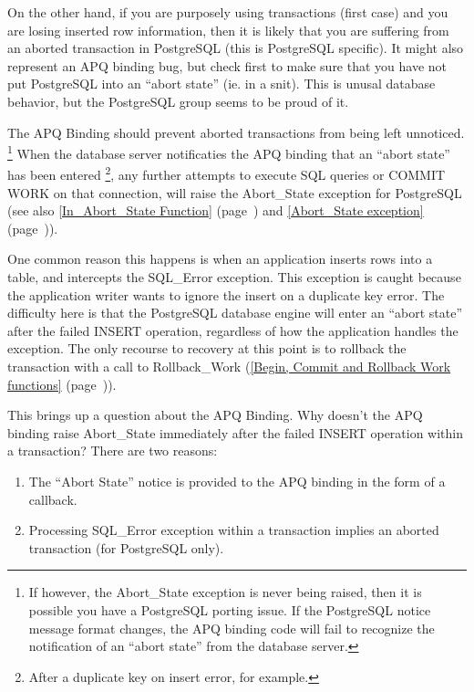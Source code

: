 \documentclass[english,letterpaper]{book}
\newcommand\Ref[1]{\textsection\ref{#1} (page~\pageref{#1})}
\begin{document}
On the other hand, if you are purposely using transactions (first
case) and you are losing inserted row information, then it is likely
that you are suffering from an aborted transaction in PostgreSQL (this
is PostgreSQL specific). It might also represent an APQ binding bug,
but check first to make sure that you have not put PostgreSQL into
an ``abort state'' (ie. in a snit). This is unusal database behavior,
but the PostgreSQL group seems to be proud of it.

The APQ Binding should prevent aborted transactions from being left
unnoticed.%
\footnote{If however, the Abort\_State exception is never being raised, then
it is possible you have a PostgreSQL porting issue. If the PostgreSQL
notice message format changes, the APQ binding code will fail to recognize
the notification of an ``abort state'' from the database server.%
} When the database server notificaties the APQ binding that an {}``abort
state'' has been entered%
\footnote{After a duplicate key on insert error, for example.%
}, any further attempts to execute SQL queries or COMMIT WORK on that
connection, will raise the Abort\_State exception for PostgreSQL (see
also \Ref{In_Abort_State Function} and \Ref{Abort_State exception}).

One common reason this happens is when an application inserts rows
into a table, and intercepts the SQL\_Error exception. This exception
is caught because the application writer wants to ignore the insert
on a duplicate key error. The difficulty here is that the PostgreSQL
database engine will enter an ``abort state'' after the failed
INSERT operation, regardless of how the application handles the exception.
The only recourse to recovery at this point is to rollback the transaction
with a call to Rollback\_Work (\Ref{Begin, Commit and Rollback Work functions}).

This brings up a question about the APQ Binding. Why doesn't the APQ
binding raise Abort\_State immediately after the failed INSERT operation
within a transaction? There are two reasons:

\begin{enumerate}
   \item The ``Abort State'' notice is provided to the APQ binding in the
         form of a callback.
   \item Processing SQL\_Error exception within a transaction implies an aborted
         transaction (for PostgreSQL only).
\end{enumerate}
\end{document}
